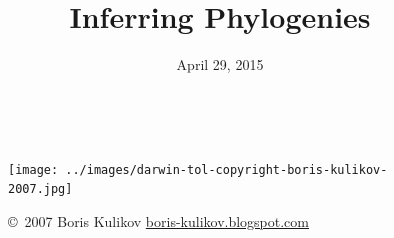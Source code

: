 


% 



\title[Inferring Phylogenies]{Inferring Phylogenies}
\date{April 29, 2015}



\begin{noheadline}
\begin{frame}
    \begin{columns}[c]
            \maketitle
            \begin{figure}
                \begin{center}
                \texttt{[image: ../images/darwin-tol-copyright-boris-kulikov-2007.jpg]}
                \caption{\tiny \copyright~2007 Boris Kulikov \href{http://boris-kulikov.blogspot.com/}{boris-kulikov.blogspot.com}}
                \end{center}
            \end{figure}
    \end{columns}
\end{frame}
\end{noheadline}

